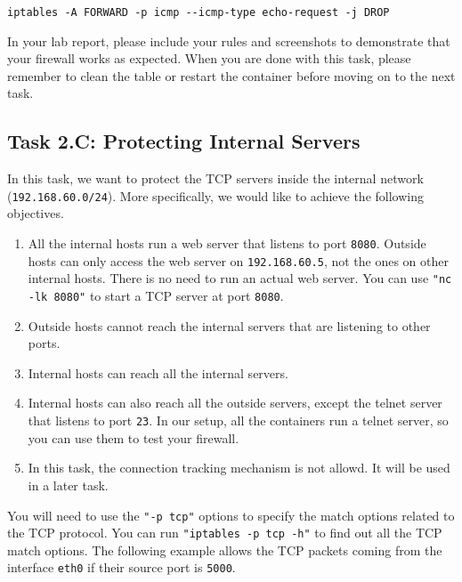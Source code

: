 \begin{lstlisting}
iptables -A FORWARD -p icmp --icmp-type echo-request -j DROP
\end{lstlisting}

In your lab report, please include your rules and  
screenshots to demonstrate that your firewall works as expected.
When you are done with this task,
please remember to clean the table or restart the container 
before moving on to the next task.


\subsection{Task 2.C: Protecting Internal Servers}

In this task, we want to protect the TCP servers 
inside the internal network (\texttt{192.168.60.0/24}). 
More specifically, we would like to achieve the following objectives.

\begin{enumerate}[noitemsep]
  \item All the internal hosts run a web server that listens to port \texttt{8080}. 
    Outside hosts can only access the web server on \texttt{192.168.60.5},
    not the ones on other internal hosts.
    There is no need to run an actual web server. You can use 
    \texttt{"nc -lk 8080"} to start a TCP server at port \texttt{8080}.  

  \item Outside hosts cannot reach the internal servers 
    that are listening to other ports.

  \item Internal hosts can reach all the internal servers.

  \item Internal hosts can also reach all the outside servers, except 
    the telnet server that listens to port \texttt{23}. In our setup,
    all the containers run a telnet server, so you can use them 
    to test your firewall.

  \item In this task, the connection tracking mechanism is not allowd. 
    It will be used in a later task. 
\end{enumerate}

You will need to use the \texttt{"-p tcp"} options to specify the match
options related to the TCP protocol. You can run 
\texttt{"iptables -p tcp -h"} to find out all the TCP match
options. The following example allows the TCP packets coming from
the interface \texttt{eth0} if their source port is \texttt{5000}.  

